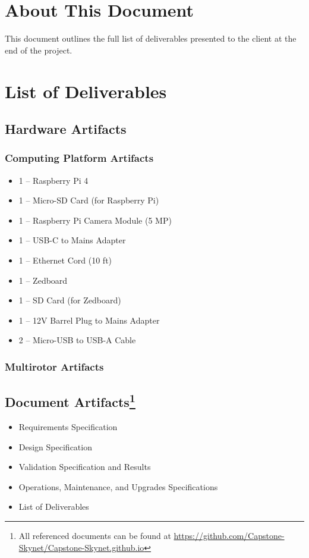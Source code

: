 \documentclass[10pt,letterpaper]{article}
\begin{document}

\section{About This Document}
This document outlines the full list of deliverables presented to the client at the end of the project.

\section{List of Deliverables}
\subsection{Hardware Artifacts}
\subsubsection{Computing Platform Artifacts}
\begin{itemize}
\item 1 -- Raspberry Pi 4
\item 1 -- Micro-SD Card (for Raspberry Pi)
\item 1 -- Raspberry Pi Camera Module (5 MP)
\item 1 -- USB-C to Mains Adapter
\item 1 -- Ethernet Cord (10 ft)
\item 1 -- Zedboard
\item 1 -- SD Card (for Zedboard)
\item 1 -- 12V Barrel Plug to Mains Adapter
\item 2 -- Micro-USB to USB-A Cable
\end{itemize}

\subsubsection{Multirotor Artifacts}

\subsection[Document Artifacts]{Document Artifacts\footnote{All referenced documents can be found at \url{https://github.com/Capstone-Skynet/Capstone-Skynet.github.io}}}

\begin{itemize}

\item Requirements Specification
\item Design Specification
\item Validation Specification and Results
\item Operations, Maintenance, and Upgrades Specifications
\item List of Deliverables
\end{itemize}
\end{document}
